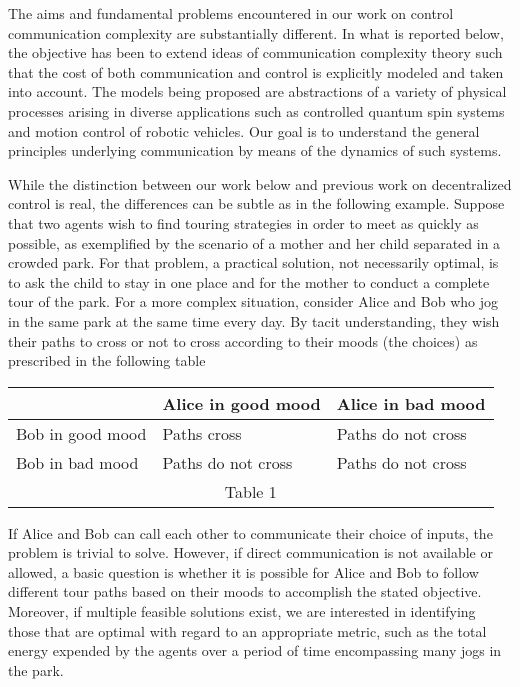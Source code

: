 \documentclass[12pt,onecolumn,draftcls]{IEEEtran}
\begin{document}
The aims and fundamental problems encountered in our work on control communication complexity are substantially different.  In what is reported below, the objective has been to extend ideas of communication complexity theory such that the cost of both communication and control is explicitly modeled and taken into account.  The models being proposed are abstractions of a variety of physical processes arising in diverse applications such as controlled quantum spin systems and motion control of robotic vehicles.  Our goal is to understand the general principles underlying communication by means of the dynamics of such systems.


While the distinction between our work below and previous work on decentralized control is real, the differences can be subtle as in the following example.  Suppose that two agents wish to find touring strategies in order to meet as quickly as possible,
as exemplified by the scenario of a mother and her child separated in a crowded park.   For that problem, a practical solution, not necessarily optimal, is to ask
the child to stay in one place and for the mother to conduct a complete tour of the park.  For a more complex situation,
consider Alice and Bob who jog in the same park at the same time every day. 
By tacit understanding, they wish their paths to cross or not to cross according to their moods
(the choices) as prescribed in the following table

\vspace{0.1cm}
\begin{center}
\small
\begin{tabular}{|l|l|l|}
\hline 
& Alice in good mood & Alice in bad mood \\
\hline
Bob in good mood & Paths cross& Paths do not cross \\
\hline
Bob in bad mood & Paths do not cross & Paths do not cross \\
\hline
\multicolumn{3}{c}{Table 1}  
\end{tabular}
\end{center}
If Alice and Bob can call each other to communicate their choice of inputs, the problem is trivial to solve.
However, if direct communication is not available or allowed, a basic question is whether it is possible for
Alice and Bob to follow different tour paths based on their moods to accomplish the stated
objective.  Moreover, if multiple feasible solutions exist, we are interested in identifying those that are optimal with regard to an appropriate metric, such as the total energy expended by the agents over a period of time encompassing many jogs in the park.
\end{document}
